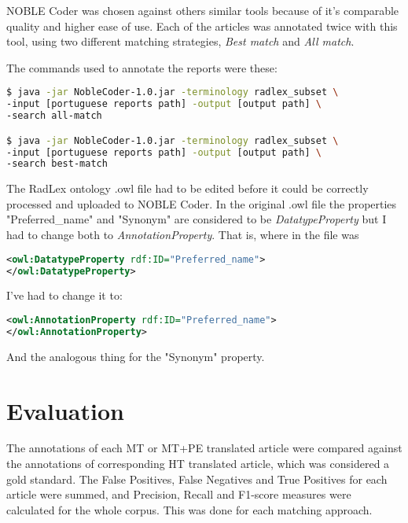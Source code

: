 NOBLE Coder was chosen against others similar tools because of it's comparable quality and higher ease of use. Each of the articles was annotated twice with this tool, using two different matching strategies, \textit{Best match} and \textit{All match}.

The commands used to annotate the reports were these:


\begin{lstlisting}[language=bash]
$ java -jar NobleCoder-1.0.jar -terminology radlex_subset \
-input [portuguese reports path] -output [output path] \
-search all-match

$ java -jar NobleCoder-1.0.jar -terminology radlex_subset \
-input [portuguese reports path] -output [output path] \
-search best-match
\end{lstlisting}


The RadLex ontology .owl file had to be edited before it could be correctly processed and uploaded to NOBLE Coder. In the original .owl file the properties  "Preferred\_name" and "Synonym" are considered to be \textit{DatatypeProperty} but I had to change both to \textit{AnnotationProperty}. That is, where in the file was


\begin{lstlisting}[language=xml]
<owl:DatatypeProperty rdf:ID="Preferred_name">
</owl:DatatypeProperty>
\end{lstlisting}


I've had to change it to:


\begin{lstlisting}[language=xml]
<owl:AnnotationProperty rdf:ID="Preferred_name">
</owl:AnnotationProperty>
\end{lstlisting}


And the analogous thing for the "Synonym" property.

\section{Evaluation}

The annotations of each MT or MT+PE translated article were compared against the annotations of corresponding HT translated article, which was considered a gold standard. The False Positives, False Negatives and True Positives for each article were summed, and Precision, Recall and F1-score measures were calculated for the whole corpus. This was done for each matching approach. 





 